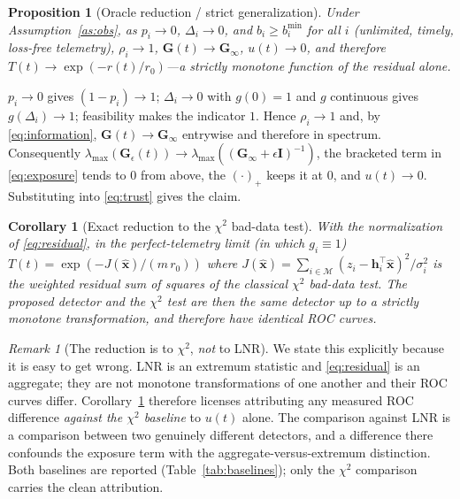 \documentclass[journal]{IEEEtran}
\theoremstyle{plain}
\newtheorem{proposition}{Proposition}
\newtheorem{corollary}{Corollary}
\theoremstyle{definition}
\theoremstyle{remark}
\newtheorem{remark}{Remark}
\newcommand{\bxh}{\hat{\mathbf{x}}}
\newcommand{\bh}{\mathbf{h}}
\newcommand{\bG}{\mathbf{G}}
\newcommand{\bI}{\mathbf{I}}
\newcommand{\lmax}{\lambda_{\max}}
\begin{document}
\begin{proposition}[Oracle reduction / strict generalization]
\label{prop:reduction}
Under Assumption~\ref{as:obs}, as $p_i\to0$, $\Delta_i\to0$, and
$b_i\ge b_i^{\min}$ for all $i$ (unlimited, timely, loss-free telemetry),
$\rho_i\to1$, $\bG(t)\to\bG_{\infty}$, $u(t)\to0$, and therefore
$T(t)\to\exp(-r(t)/r_0)$---a strictly monotone function of the residual
alone.
\end{proposition}
\begin{IEEEproof}
$p_i\to0$ gives $(1-p_i)\to1$; $\Delta_i\to0$ with $g(0)=1$ and $g$
continuous gives $g(\Delta_i)\to1$; feasibility makes the indicator $1$.
Hence $\rho_i\to1$ and, by \eqref{eq:information},
$\bG(t)\to\bG_{\infty}$ entrywise and therefore in spectrum. Consequently
$\lmax(\bG_{\epsilon}(t))\to\lmax((\bG_{\infty}+\epsilon\bI)^{-1})$, the
bracketed term in \eqref{eq:exposure} tends to $0$ from above, the
$(\cdot)_{+}$ keeps it at $0$, and $u(t)\to0$. Substituting into
\eqref{eq:trust} gives the claim.
\end{IEEEproof}

\begin{corollary}[Exact reduction to the $\chi^{2}$ bad-data test]
\label{cor:exact}
With the normalization of \eqref{eq:residual}, in the perfect-telemetry
limit (in which $g_i\equiv1$) $T(t)=\exp(-J(\bxh)/(m\,r_0))$ where
$J(\bxh)=\sum_{i\in\mathcal{M}}(z_i-\bh_i^{\top}\bxh)^{2}/\sigma_i^{2}$ is
the weighted residual sum of squares of the classical $\chi^{2}$ bad-data
test. The proposed detector and the $\chi^{2}$ test are then \emph{the
same detector} up to a strictly monotone transformation, and therefore
have identical ROC curves.
\end{corollary}

\begin{remark}[The reduction is to $\chi^{2}$, \emph{not} to LNR]
\label{rem:notlnr}
We state this explicitly because it is easy to get wrong. LNR is an
extremum statistic and \eqref{eq:residual} is an aggregate; they are not
monotone transformations of one another and their ROC curves differ.
Corollary~\ref{cor:exact} therefore licenses attributing any measured
ROC difference \emph{against the $\chi^{2}$ baseline} to $u(t)$ alone. The
comparison against LNR is a comparison between two genuinely different
detectors, and a difference there confounds the exposure term with the
aggregate-versus-extremum distinction. Both baselines are reported
(Table~\ref{tab:baselines}); only the $\chi^{2}$ comparison carries the
clean attribution.
\end{remark}
\end{document}
